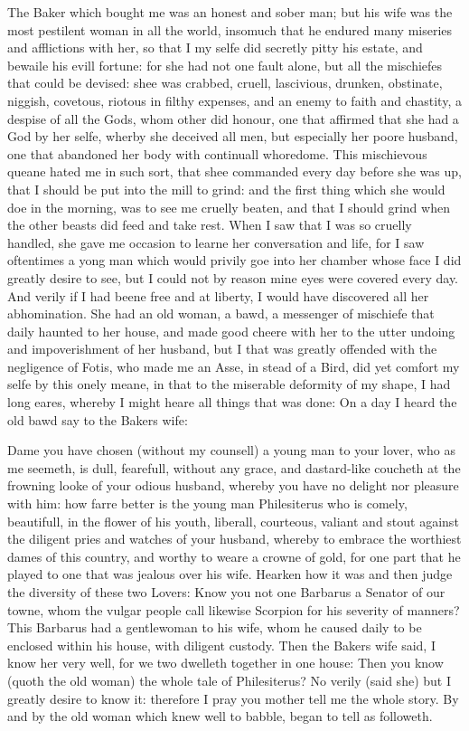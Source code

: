 The Baker which bought me was an honest and sober man; but his wife was the
most pestilent woman in all the world, insomuch that he endured many miseries
and afflictions with her, so that I my selfe did secretly pitty his estate, and
bewaile his evill fortune: for she had not one fault alone, but all the
mischiefes that could be devised: shee was crabbed, cruell, lascivious,
drunken, obstinate, niggish, covetous, riotous in filthy expenses, and an enemy
to faith and chastity, a despise of all the Gods, whom other did honour, one
that affirmed that she had a God by her selfe, wherby she deceived all men, but
especially her poore husband, one that abandoned her body with continuall
whoredome. This mischievous queane hated me in such sort, that shee commanded
every day before she was up, that I should be put into the mill to grind: and
the first thing which she would doe in the morning, was to see me cruelly
beaten, and that I should grind when the other beasts did feed and take rest.
When I saw that I was so cruelly handled, she gave me occasion to learne her
conversation and life, for I saw oftentimes a yong man which would privily goe
into her chamber whose face I did greatly desire to see, but I could not by
reason mine eyes were covered every day. And verily if I had beene free and at
liberty, I would have discovered all her abhomination. She had an old woman, a
bawd, a messenger of mischiefe that daily haunted to her house, and made good
cheere with her to the utter undoing and impoverishment of her husband, but I
that was greatly offended with the negligence of Fotis, who made me an Asse, in
stead of a Bird, did yet comfort my selfe by this onely meane, in that to the
miserable deformity of my shape, I had long eares, whereby I might heare all
things that was done: On a day I heard the old bawd say to the Bakers wife:

Dame you have chosen (without my counsell) a young man to your lover, who as me
seemeth, is dull, fearefull, without any grace, and dastard-like coucheth at
the frowning looke of your odious husband, whereby you have no delight nor
pleasure with him: how farre better is the young man Philesiterus who is
comely, beautifull, in the flower of his youth, liberall, courteous, valiant
and stout against the diligent pries and watches of your husband, whereby to
embrace the worthiest dames of this country, and worthy to weare a crowne of
gold, for one part that he played to one that was jealous over his wife.
Hearken how it was and then judge the diversity of these two Lovers: Know you
not one Barbarus a Senator of our towne, whom the vulgar people call likewise
Scorpion for his severity of manners? This Barbarus had a gentlewoman to his
wife, whom he caused daily to be enclosed within his house, with diligent
custody. Then the Bakers wife said, I know her very well, for we two dwelleth
together in one house: Then you know (quoth the old woman) the whole tale of
Philesiterus? No verily (said she) but I greatly desire to know it: therefore I
pray you mother tell me the whole story. By and by the old woman which knew
well to babble, began to tell as followeth.

